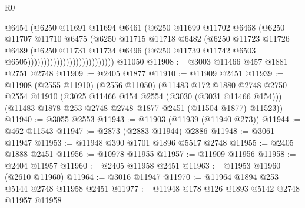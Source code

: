\begin{lexlean}{R0}
\begin{coremodule}
                                            @6454
                                            (@6250
                                              @11691
                                              @11694
                                              @6461
                                              (@6250
                                                @11699
                                                @11702
                                                @6468
                                                (@6250
                                                  @11707
                                                  @11710
                                                  @6475
                                                  (@6250
                                                    @11715
                                                    @11718
                                                    @6482
                                                    (@6250
                                                      @11723
                                                      @11726
                                                      @6489
                                                      (@6250
                                                        @11731
                                                        @11734
                                                        @6496
                                                        (@6250
                                                          @11739
                                                          @11742
                                                          @6503
                                                          @6505)))))))))))))))))))))))))))
    @11050
@11908 := @3003 @11466 @457 @1881 @2751 @2748
@11909 := @2405 @1877
@11910 := @11909 @2451
@11939 := @11908
    (@2555 @11910)
    (@2556 @11050)
    (@11483
      @172
      @1880
      @2748
      @2750
      @2554
      @11910
      (@3025 @11466 @154 @2554 (@3030 (@3031 @11466 @154)))
      (@11483 @1878 @253 @2748 @2748 @1877 @2451 (@11504 @1877) @11523))
@11940 := @3055 @2553
@11943 := @11903 (@11939 (@11940 @273))
@11944 := @462 @11543
@11947 := @2873 (@2883 @11944) @2886
@11948 := @3061 @11947
@11953 := @11948 @390 @1701 @1896 @5517 @2748
@11955 := @2405 @1888 @2451
@11956 := @10978 @11955
@11957 := @11909 @11956
@11958 := @2404 @11957
@11960 := @2405 @11958 @2451
@11963 := @11953 @11960 (@2610 @11960)
@11964 := @3016 @11947
@11970 := @11964 @1894 @253 @5144 @2748 @11958 @2451
@11977 := @11948 @178 @126 @1893 @5142 @2748 @11957 @11958

\end{coremodule}
\end{lexlean}
